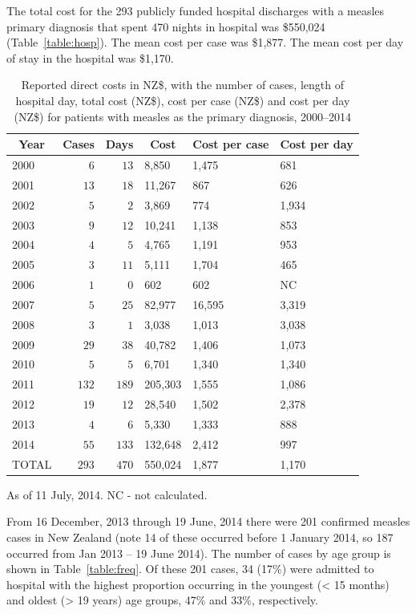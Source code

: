 \documentclass{article}
\begin{document}
The total cost for the 293 publicly funded hospital discharges with a measles primary diagnosis that spent 470 nights in hospital was \$550,024 (Table~\autoref{table:hosp}). The mean cost per case was \$1,877. The mean cost per day of stay in the hospital was \$1,170.



\begin{table}
\caption{Reported direct costs in NZ\$, with the number of cases, length of hospital day, total cost (NZ\$), cost per case (NZ\$) and cost per day (NZ\$) for patients with measles as the primary diagnosis, 2000--2014}
\begin{center}
\begin{tabular}{lrrlll}
\hline\hline
\multicolumn{1}{c}{Year}&\multicolumn{1}{c}{Cases}&\multicolumn{1}{c}{Days}&\multicolumn{1}{c}{Cost}&\multicolumn{1}{c}{Cost per case}&\multicolumn{1}{c}{Cost per day}\tabularnewline
\hline
2000&$  6$&$ 13$&8,850&1,475&681\tabularnewline
2001&$ 13$&$ 18$&11,267&867&626\tabularnewline
2002&$  5$&$  2$&3,869&774&1,934\tabularnewline
2003&$  9$&$ 12$&10,241&1,138&853\tabularnewline
2004&$  4$&$  5$&4,765&1,191&953\tabularnewline
2005&$  3$&$ 11$&5,111&1,704&465\tabularnewline
2006&$  1$&$  0$&602&602&NC\tabularnewline
2007&$  5$&$ 25$&82,977&16,595&3,319\tabularnewline
2008&$  3$&$  1$&3,038&1,013&3,038\tabularnewline
2009&$ 29$&$ 38$&40,782&1,406&1,073\tabularnewline
2010&$  5$&$  5$&6,701&1,340&1,340\tabularnewline
2011&$132$&$189$&205,303&1,555&1,086\tabularnewline
2012&$ 19$&$ 12$&28,540&1,502&2,378\tabularnewline
2013&$  4$&$  6$&5,330&1,333&888\tabularnewline
2014&$ 55$&$133$&132,648&2,412&997\tabularnewline
TOTAL&$293$&$470$&550,024&1,877&1,170\tabularnewline
\hline
\end{tabular}\end{center}\label{table:hosp}
 \centering
 \begin{tablenotes}
      \small
      \item As of 11 July, 2014. NC - not calculated.
    \end{tablenotes}
\end{table}

From 16 December, 2013 through 19 June, 2014 there were 201 confirmed measles cases in New Zealand (note 14 of these occurred before 1 January 2014, so 187 occurred from Jan 2013 -- 19 June 2014). The number of cases by age group is shown in Table~\autoref{table:freq}. Of these 201 cases, 34 (17\%) were admitted to hospital with the highest proportion occurring in the youngest (< 15 months) and oldest (> 19 years) age groups, 47\% and 33\%, respectively.
\end{document}
